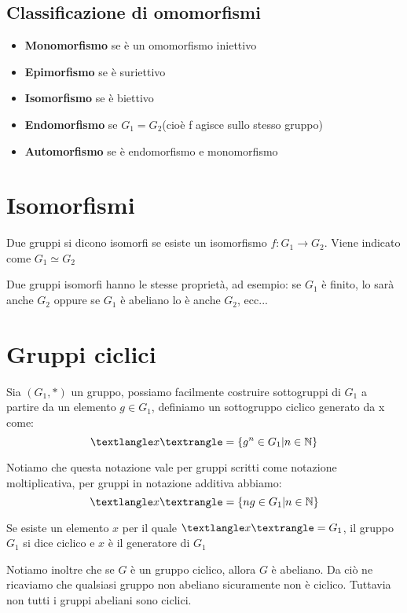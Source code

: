 \documentclass[a4paper, 10pt]{article}
\begin{document}
\subsection{Classificazione di omomorfismi}

\begin{itemize}
	\item \textbf{Monomorfismo} se è un omomorfismo iniettivo
	\item \textbf{Epimorfismo} se è suriettivo
	\item \textbf{Isomorfismo} se è biettivo
	\item \textbf{Endomorfismo} se $G_1 = G_2$(cioè f agisce sullo stesso gruppo)
	\item \textbf{Automorfismo} se è endomorfismo e monomorfismo
\end{itemize}

\section{Isomorfismi}

Due gruppi si dicono isomorfi se esiste un isomorfismo $f: G_1 \rightarrow G_2$. Viene indicato come $G_1 \simeq G_2$

Due gruppi isomorfi hanno le stesse proprietà, ad esempio: se $G_1$ è finito, lo sarà anche $G_2$ oppure se $G_1$ è abeliano lo è anche $G_2$, ecc...

\section{Gruppi ciclici}

Sia $(G_1, *)$ un gruppo, possiamo facilmente costruire sottogruppi di $G_1$ a partire da un elemento $g \in G_1$, definiamo un sottogruppo ciclico generato da x come: $$\textlangle x \textrangle = \{g^n \in G_1| n \in \mathbb{N}\}$$

Notiamo che questa notazione vale per gruppi scritti come notazione moltiplicativa, per gruppi in notazione additiva abbiamo: $$\textlangle x \textrangle = \{ng \in G_1| n \in \mathbb{N}\}$$

Se esiste un elemento $x$ per il quale $\textlangle x \textrangle = G_1$, il gruppo $G_1$ si dice ciclico e $x$ è il generatore di $G_1$

Notiamo inoltre che se $G$ è un gruppo ciclico, allora $G$ è abeliano. Da ciò ne ricaviamo che qualsiasi gruppo non abeliano sicuramente non è ciclico. Tuttavia non tutti i gruppi abeliani sono ciclici.
\end{document}
